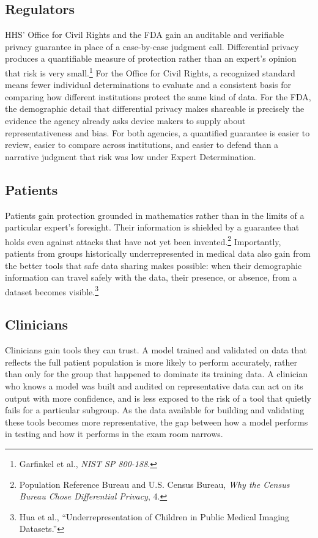\documentclass[11pt]{article}
\begin{document}
\subsection{Regulators}

HHS' Office for Civil Rights and the FDA gain an auditable and verifiable privacy guarantee in place of a case-by-case judgment call. Differential privacy produces a quantifiable measure of protection rather than an expert's opinion that risk is very small.\footnote{Garfinkel et al., \textit{NIST SP 800-188}.} For the Office for Civil Rights, a recognized standard means fewer individual determinations to evaluate and a consistent basis for comparing how different institutions protect the same kind of data. For the FDA, the demographic detail that differential privacy makes shareable is precisely the evidence the agency already asks device makers to supply about representativeness and bias. For both agencies, a quantified guarantee is easier to review, easier to compare across institutions, and easier to defend than a narrative judgment that risk was low under Expert Determination.

\subsection{Patients}

Patients gain protection grounded in mathematics rather than in the limits of a particular expert's foresight. Their information is shielded by a guarantee that holds even against attacks that have not yet been invented.\footnote{Population Reference Bureau and U.S. Census Bureau, \textit{Why the Census Bureau Chose Differential Privacy}, 4.} Importantly, patients from groups historically underrepresented in medical data also gain from the better tools that safe data sharing makes possible: when their demographic information can travel safely with the data, their presence, or absence, from a dataset becomes visible.\footnote{Hua et al., ``Underrepresentation of Children in Public Medical Imaging Datasets.''} 

\subsection{Clinicians}

Clinicians gain tools they can trust. A model trained and validated on data that reflects the full patient population is more likely to perform accurately, rather than only for the group that happened to dominate its training data. A clinician who knows a model was built and audited on representative data can act on its output with more confidence, and is less exposed to the risk of a tool that quietly fails for a particular subgroup. As the data available for building and validating these tools becomes more representative, the gap between how a model performs in testing and how it performs in the exam room narrows.
\end{document}
